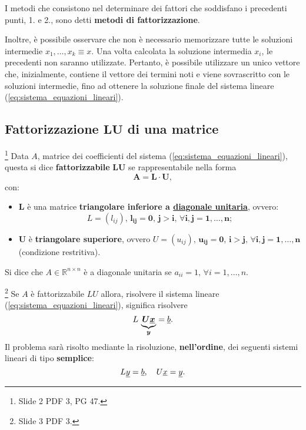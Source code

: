 I metodi che consistono nel determinare dei fattori che soddisfano i precedenti punti, 1. e 2., sono detti \textbf{metodi di fattorizzazione}.

Inoltre, è possibile osservare che non è necessario memorizzare tutte le soluzioni intermedie $x_1,\hdots, x_k\equiv x$. Una volta calcolata la soluzione intermedia $x_i$, le precedenti non saranno utilizzate. Pertanto, è possibile utilizzare un unico vettore che, inizialmente, contiene il vettore dei termini noti e viene sovrascritto con le soluzioni intermedie, fino ad ottenere la soluzione finale del sistema lineare (\ref{eq:sistema_equazioni_lineari}).

\subsection{Fattorizzazione \texorpdfstring{$\boldsymbol{LU}$}{LU} di una matrice}
\begin{definition}\footnote{Slide 2 PDF 3, PG 47.}
    Data $A$, matrice dei coefficienti del sistema (\ref{eq:sistema_equazioni_lineari}), questa si dice \textbf{fattorizzabile} $\boldsymbol{LU}$ se rappresentabile nella forma
    \begin{equation}\label{eq:ALU}
        \boldsymbol{A=L\cdot U},
    \end{equation}
   con:
    \begin{itemize}
        \item $\boldsymbol L$ è una matrice \textbf{triangolare inferiore a \ul{diagonale unitaria}}, ovvero: 
        \begin{equation*}
            L=(l_{ij}),\, \boldsymbol{l_{ij}=0,\, j>i,\, \forall i,j=1,\hdots, n};
        \end{equation*}
        \item $\boldsymbol U$ è \textbf{triangolare superiore}, ovvero $U=(u_{ij}),\, \boldsymbol{u_{ij}=0,\, i>j,\, \forall i,j=1,\hdots, n}$ (condizione restritiva).
    \end{itemize}
\end{definition}

\begin{definition}
	Si dice che $A\in\mathbb{R}^{n\times n}$ è a diagonale unitaria se $a_{ii}=1,\, \forall i=1,\hdots, n$.
\end{definition}

\begin{remark}\footnote{Slide 3 PDF 3.}
    Se $A$ è fattorizzabile $LU$ allora, risolvere il sistema lineare (\ref{eq:sistema_equazioni_lineari}), significa risolvere
    \begin{equation*}
        L\, \underbrace{\boldsymbol{U\uline x}}_{\boldsymbol y}= \uline b.
    \end{equation*}
    Il problema sarà risolto mediante la risoluzione, \textbf{nell'ordine}, dei seguenti sistemi lineari di tipo \textbf{semplice}:
    \begin{equation*}
        L\uline y =\uline b,\quad U\uline x= \uline y.
    \end{equation*}
\end{remark}

